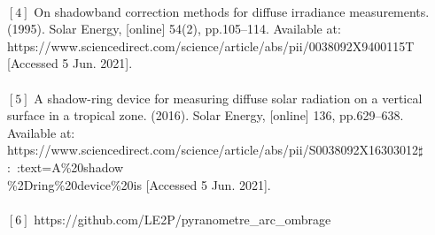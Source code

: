 \documentclass[12pt,a4paper]{article}
\begin{document}
\begin{flushleft}
‌~\\
$[4]$ On shadowband correction methods for diffuse irradiance measurements. (1995). Solar Energy, [online] 54(2), pp.105–114. Available at: https://www.sciencedirect.com/science/article/abs/pii/0038092X9400115T [Accessed 5 Jun. 2021].\\

‌~\\
$[5]$ A shadow-ring device for measuring diffuse solar radiation on a vertical surface in a tropical zone. (2016). Solar Energy, [online] 136, pp.629–638. Available at: https://www.sciencedirect.com/science/article/abs/pii/S0038092X16303012$\sharp$:~:text=A\%20shadow\\\%2Dring\%20device\%20is [Accessed 5 Jun. 2021].\\
‌~\\
$[6]$ https://github.com/LE2P/pyranometre\_arc\_ombrage

‌


\end{flushleft}






\end{document}
